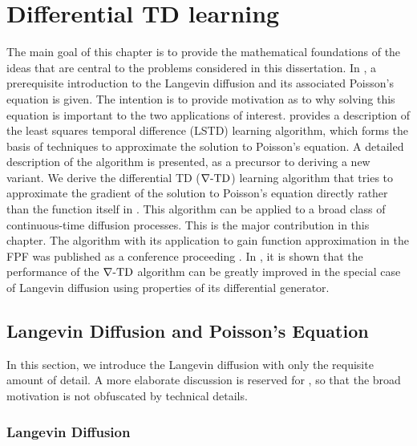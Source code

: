 \chapter{Differential TD learning} %
\label{ch:diff_td}
The main goal of this chapter is to provide the mathematical foundations of the ideas that are central to the problems considered in this dissertation.
In , a prerequisite introduction to the Langevin diffusion and its associated Poisson's equation is given. The intention is to provide motivation as to why solving this equation is important to the two applications of interest.  provides a description of the least squares temporal difference (LSTD) learning algorithm, which forms the basis of techniques to approximate the solution to Poisson's equation. A detailed description of the algorithm is presented, as a precursor to deriving a new variant. We derive the differential TD ($\nabla\text{-TD}$) learning algorithm that tries to approximate the gradient of the solution to Poisson's equation directly rather than the function itself in . This algorithm can be applied to 	a broad class of continuous-time diffusion processes. This is the major contribution in this chapter. The algorithm with its application to gain function approximation in the FPF was published as a conference proceeding \cite{raddevmey16}. In , it is shown that the performance of the $\nabla\text{-TD}$ algorithm can be greatly improved in the special case of Langevin diffusion using properties of its differential generator. 

\section{Langevin Diffusion and Poisson's Equation}
\label{s:langevin_diffusion}
In this section, we introduce the Langevin diffusion with only the requisite amount of detail. A more elaborate discussion is reserved for , so that the broad motivation is not obfuscated by  technical details.  %

\subsection{Langevin Diffusion}

